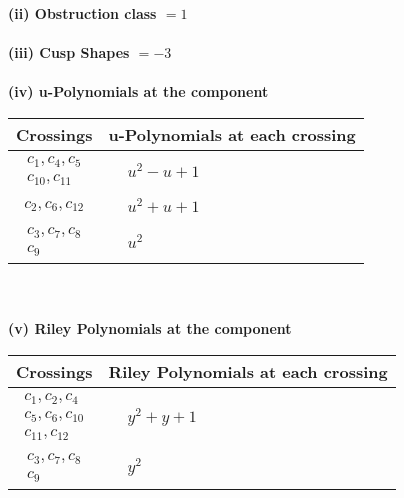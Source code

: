 \documentclass[1p]{elsarticle_modified}
\theoremstyle{definition}
\begin{document}
\flushleft \textbf{(ii) Obstruction class $= 1$}\\~\\
\flushleft \textbf{(iii) Cusp Shapes $= -3$}\\~\\
\newpage\renewcommand{\arraystretch}{1}
\flushleft \textbf{(iv) u-Polynomials at the component}\newline \\
\begin{tabular}{m{50pt}|m{274pt}}
Crossings & \hspace{64pt}u-Polynomials at each crossing \\
\hline $$\begin{aligned}c_{1},c_{4},c_{5}\\c_{10},c_{11}\end{aligned}$$&$\begin{aligned}
&u^2- u+1
\end{aligned}$\\
\hline $$\begin{aligned}c_{2},c_{6},c_{12}\end{aligned}$$&$\begin{aligned}
&u^2+u+1
\end{aligned}$\\
\hline $$\begin{aligned}c_{3},c_{7},c_{8}\\c_{9}\end{aligned}$$&$\begin{aligned}
&u^2
\end{aligned}$\\
\hline
\end{tabular}\\~\\
\newpage\renewcommand{\arraystretch}{1}
\flushleft \textbf{(v) Riley Polynomials at the component}\newline \\
\begin{tabular}{m{50pt}|m{274pt}}
Crossings & \hspace{64pt}Riley Polynomials at each crossing \\
\hline $$\begin{aligned}c_{1},c_{2},c_{4}\\c_{5},c_{6},c_{10}\\c_{11},c_{12}\end{aligned}$$&$\begin{aligned}
&y^2+y+1
\end{aligned}$\\
\hline $$\begin{aligned}c_{3},c_{7},c_{8}\\c_{9}\end{aligned}$$&$\begin{aligned}
&y^2
\end{aligned}$\\
\hline
\end{tabular}\\~\\
\end{document}
